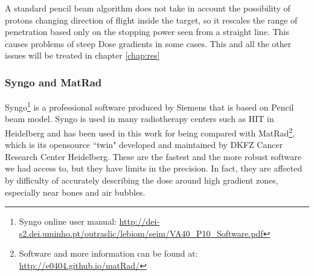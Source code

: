 \documentclass[12pt, a4paper, twoside]{book}
\begin{document}
A standard pencil beam algorithm does not take in account the possibility of protons changing direction of flight inside the target, so it rescales the range of penetration based only on the stopping power seen from a straight line. This causes problems of steep Dose gradients in some cases. This and all the other issues will be treated in chapter \ref{chap:res}

\subsubsection{Syngo and MatRad}
Syngo\footnote{Syngo online user manual: \url{http://dei-s2.dei.uminho.pt/outraslic/lebiom/seim/VA40_P10_Software.pdf}} is a professional software produced by Siemens that is based on Pencil beam model. Syngo is used in many radiotherapy centers such as HIT in Heidelberg and has been used in this work for being compared with MatRad\footnote{Software and more information can be found at: \url{http://e0404.github.io/matRad/}}, which is its opensource ``twin" developed and maintained by DKFZ Cancer Research Center Heidelberg. 
These are the fastest and the more robust software we had access to, but they have limits in the precision. In fact, they are affected by difficulty of accurately describing the dose around high gradient zones, especially near bones and air bubbles.
\end{document}
